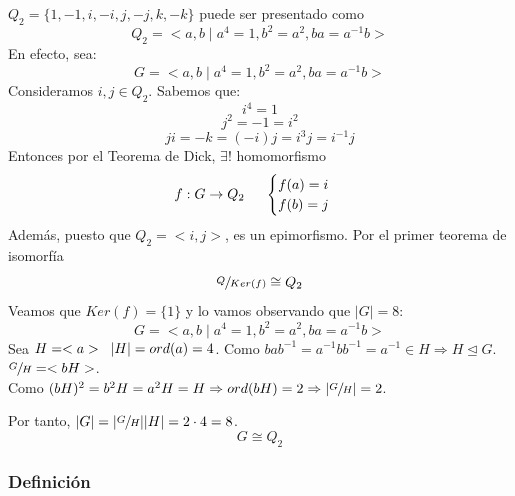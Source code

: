 \documentclass[11pt,a4paper]{article}
\begin{document}
$Q_{2} = \{1, -1, i, -i, j, -j, k, -k\}$ puede ser presentado como
$$Q_{2} = <a, b \mid a^{4} = 1, b^{2} = a^{2}, ba = a^{-1}b>$$
En efecto, sea:
$$G = <a, b \mid a^{4} = 1, b^{2} = a^{2}, ba = a^{-1}b>$$
Consideramos $i, j \in Q_{2}$. Sabemos que:
$$i^{4} = 1$$
$$j^{2} = -1 = i^{2}$$
$$ji = -k = (-i)j = i^{3}j = i^{-1}j$$
Entonces por el Teorema de Dick, $\exists !$ homomorfismo
$$f: G \to Q_{2} \hspace{0.5cm}
\begin{cases}
f(a) = i \\
f(b) = j
\end{cases}$$
Además, puesto que $Q_{2} = <i, j>$, es un epimorfismo. Por el primer teorema de isomorfía
$$\sfrac{Q}{Ker(f)} \cong Q_{2}$$
Veamos que $Ker(f) = \{1\}$ y lo vamos observando que $|G| = 8$:
$$G = <a, b \mid a^{4} = 1, b^{2} = a^{2}, ba = a^{-1}b>$$
Sea $H = <a> \hspace{0.2cm} |H| = ord(a) = 4$. Como $bab^{-1} = a^{-1}bb^{-1} = a^{-1} \in H \Rightarrow H \unlhd G$. \\
$\sfrac{G}{H} = <bH>$. \\
Como $(bH)^{2} = b^{2}H = a^{2}H = H \Rightarrow ord(bH) = 2 \Rightarrow |\sfrac{G}{H}| = 2$.

Por tanto, $|G| = |\sfrac{G}{H}| |H| = 2 \cdot 4 = 8$.
$$G \cong Q_{2}$$

\subsubsection*{Definición}
\end{document}

